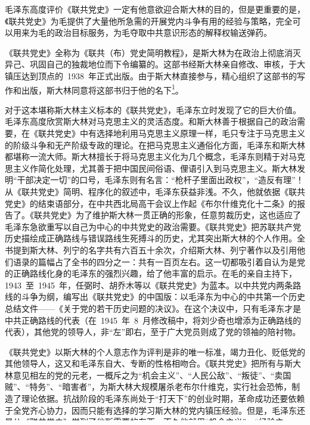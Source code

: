毛泽东高度评价《联共党史》一定有他意欲迎合斯大林的目的，但是更重要的是，《联共党史》为毛提供了大量他所急需的开展党内斗争有用的经验与策略，完全可以用来为毛的政治目标服务，为毛夺取中共意识形态的解释权输送弹药。

《联共党史》全称为《联共（布）党史简明教程》，是斯大林为在政治上彻底消灭异己、巩固自己的独裁地位而下令编纂的。这部书经斯大林亲自修改、审核，于大镇压达到顶点的~1938~年正式出版。由于斯大林直接参与，精心组织了这部书的写作和出版，斯大林同意将这部书归于他的名下\footnote{前苏联国防部军史研究所所长德里·特里安东诺维奇·沃尔里戈诺夫在其所著《胜利与悲剧——斯大林政治肖像》一书中，利用苏共中央档案，详细披露了斯大林主持撰写《联共党史》的背景及其经过。参见《胜利与悲剧——斯大林政治肖像》，第~2~卷（北京：世界知识出版社，1990~年），页~576。}。

对于这本堪称斯大林主义标本的《联共党史》，毛泽东立时发现了它的巨大价值。毛泽东高度欣赏斯大林对马克思主义的灵活态度。和斯大林善于根据自己的政治需要，在《联共党史》中有选择地利用马克思主义原理一样，毛只专注于马克思主义的阶级斗争和无产阶级专政的理论。在把马克思主义通俗化方面，毛泽东和斯大林都堪称一流大师。斯大林擅长于将马克思主义化为几个概念，毛泽东则精于对马克思主义作简化处理，尤其善于把中国民间俗语、俚语引入到马克思主义。斯大林发明“干部决定一切”的口号，毛泽东则有名言：“枪杆子里面出政权”，“造反有理”！从《联共党史》简明、程序化的叙述中，毛泽东获益非浅。不久，他就依据《联共党史》的结束语部分，在中共西北局高干会议上作起《布尔什维克化十二条》的报告了。《联共党史》为了维护斯大林一贯正确的形象，任意剪裁历史，这也适应了毛泽东急欲重写以自己为中心的中共党史的政治需要。《联共党史》把苏联共产党历史描绘成正确路线与错误路线生死搏斗的历史，尤其突出斯大林的个人作用。全书提到斯大林、列宁的名字共有六百五十余次，介绍斯大林、列宁著作以及引用他们语录的篇幅占了全书的四分之一：共有一百页左右。这一切都吸引着自认为是党的正确路线化身的毛泽东的强烈兴趣，给了他丰富的启示。在毛的亲自主持下，1943~至~1945~年，任弼时、胡乔木等以《联共党史》为蓝本。以中共党内两条路线的斗争为纲，编写出《联共党史》的中国版：以毛泽东为中心的中共第一个历史总结文件——《关于党的若干历史问题的决议》。在这个决议中，只有毛泽东才是中共正确路线的代表（在~1945~年~8~月修改稿中，将刘少奇也增添为正确路线的代表），其他党的领导人，非“左”即右，至于广大党员则成了党的领袖的陪衬物。

《联共党史》以斯大林的个人意志作为评判是非的唯一标准，竭力丑化、贬低党的其他领导人，这又和毛泽东自大、专断的性格相吻合。《联共党史》把所有与斯大林意见相左的党的元老，一概斥之为“机会主义”、“人民公敌”、“叛徒”、“卖国贼”、“特务”、“暗害者”，为斯大林大规模屠杀老布尔什维克，实行社会恐怖，制造了理论依据。抗战阶段的毛泽东尚处于“打天下”的创业时期，革命成功还要依赖于全党齐心协力，因而只能有选择的学习斯大林的党内镇压经验。但是，毛泽东还是从《联共党史》学到了他所需要的东西。不久他就用“机会主义”、“经验主义”、“教条主义”，指控党的其他领导人。在毛的高压下，绝大多数党的领导人出于对党内团结的考虑，都自觉或违心地接受了这些指控，从此，他们的“小辫子”被毛牢牢拽在手心，毛可以随时根据需要任意处置他们，自己却永远立于不败之地。

